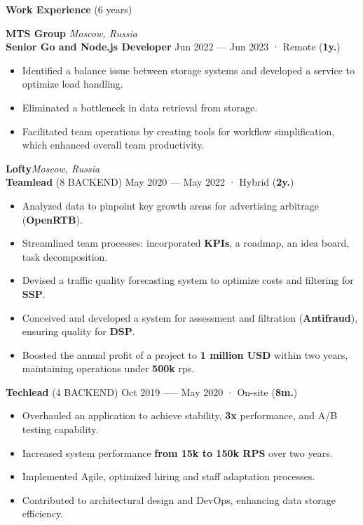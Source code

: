 \documentclass{resume}
\begin{document}
\begin{rSection}{\textbf{Work Experience} (6 years) }

\textbf{MTS Group} \hfill \textit{Moscow, Russia} \\
\textbf{Senior Go and Node.js Developer}  \hfill Jun 2022 --- Jun 2023 · Remote ({\textbf{1y.}})
\begin{itemize}
    \setlength\itemsep{-0.4em}
    \item Identified a balance issue between storage systems and developed a service to optimize load handling\@.
    \item Eliminated a bottleneck in data retrieval from storage\@.
    \item Facilitated team operations by creating tools for workflow simplification, which enhanced overall team productivity\@.
\end{itemize}

\textbf{Lofty}\hfill \textit{Moscow, Russia} \\
\textbf{Teamlead} (8 BACKEND) \hfill May 2020 --- May 2022 · Hybrid ({\textbf{2y.}})
\begin{itemize}
    \item Analyzed data to pinpoint key growth areas for advertising arbitrage (\textbf{OpenRTB})\@.
    \item Streamlined team processes: incorporated \textbf{KPIs}, a roadmap, an idea board, task decomposition\@.
    \item Devised a traffic quality forecasting system to optimize costs and filtering for \textbf{SSP}\@.
    \item Conceived and developed a system for assessment and filtration (\textbf{Antifraud}), ensuring quality for \textbf{DSP}\@.
    \item Boosted the annual profit of a project to \textbf{1 million USD} within two years, maintaining operations under \textbf{500k} rps\@.
\end{itemize}

\textbf{Techlead} (4 BACKEND) \hfill Oct 2019 —-- May 2020 · On-site ({\textbf{8m.}})
\begin{itemize}
    \item Overhauled an application to achieve stability, \textbf{3x} performance, and A/B testing capability\@.
    \item Increased system performance \textbf{from 15k to 150k RPS} over two years\@.
    \item Implemented Agile, optimized hiring and staff adaptation processes\@.
    \item Contributed to architectural design and DevOps, enhancing data storage efficiency\@.
\end{itemize}


\end{rSection}
\end{document}
